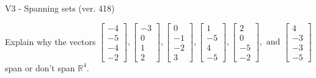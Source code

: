 \begin{exercise}
  \begin{exerciseTitle}V3 - Spanning sets (ver. 418)\end{exerciseTitle}
  \begin{exerciseStatement}
    Explain why the vectors \(\left[\begin{array}{r}
-4 \\
-5 \\
-4 \\
-2
\end{array}\right] , \left[\begin{array}{r}
-3 \\
0 \\
1 \\
2
\end{array}\right] , \left[\begin{array}{r}
0 \\
-1 \\
-2 \\
3
\end{array}\right] , \left[\begin{array}{r}
1 \\
-5 \\
4 \\
-5
\end{array}\right] , \left[\begin{array}{r}
2 \\
0 \\
-5 \\
-2
\end{array}\right] , \text{ and } \left[\begin{array}{r}
4 \\
-3 \\
-3 \\
-5
\end{array}\right]\) span or don't span \(\mathbb{R}^4\). 
	



\end{exerciseStatement}
\end{exercise}
